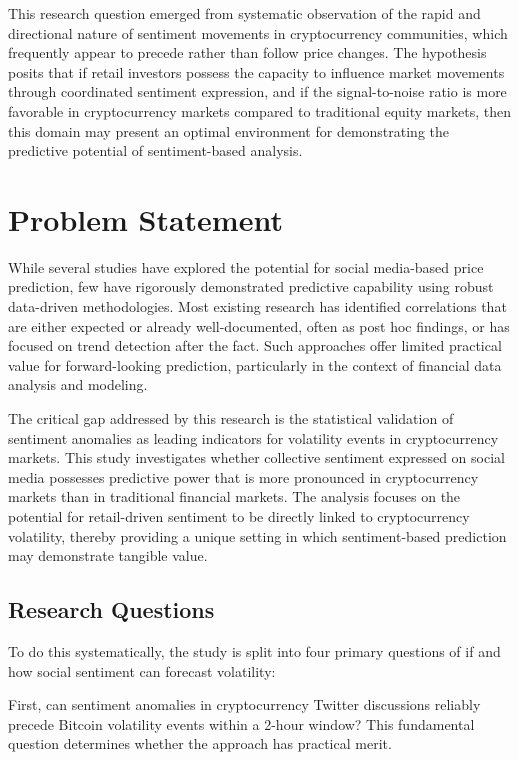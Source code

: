 \documentclass[11pt,twocolumn]{article}
\begin{document}
This research question emerged from systematic observation of the rapid and directional nature of sentiment movements in cryptocurrency communities, which frequently appear to precede rather than follow price changes. The hypothesis posits that if retail investors possess the capacity to influence market movements through coordinated sentiment expression, and if the signal-to-noise ratio is more favorable in cryptocurrency markets compared to traditional equity markets, then this domain may present an optimal environment for demonstrating the predictive potential of sentiment-based analysis.

\section{Problem Statement}

While several studies have explored the potential for social media-based price prediction, few have rigorously demonstrated predictive capability using robust data-driven methodologies. Most existing research has identified correlations that are either expected or already well-documented, often as post hoc findings, or has focused on trend detection after the fact. Such approaches offer limited practical value for forward-looking prediction, particularly in the context of financial data analysis and modeling.

The critical gap addressed by this research is the statistical validation of sentiment anomalies as leading indicators for volatility events in cryptocurrency markets. This study investigates whether collective sentiment expressed on social media possesses predictive power that is more pronounced in cryptocurrency markets than in traditional financial markets. The analysis focuses on the potential for retail-driven sentiment to be directly linked to cryptocurrency volatility, thereby providing a unique setting in which sentiment-based prediction may demonstrate tangible value.

\subsection{\textbf{Research Questions}}
To do this systematically, the study is split into four primary questions of if and how social sentiment can forecast volatility:

First, can sentiment anomalies in cryptocurrency Twitter discussions reliably precede Bitcoin volatility events within a 2-hour window? This fundamental question determines whether the approach has practical merit.
\end{document}

